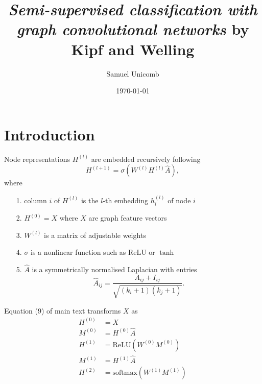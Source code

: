 \documentclass[mathserif,10pt]{beamer}
\title{\large \emph{Semi-supervised classification with graph convolutional networks} by Kipf and Welling}
\author{\scriptsize Samuel Unicomb}
\institute{\scriptsize MACSI, Department of Mathematics and Statistics, University of Limerick}
\date{\scriptsize \today}
\begin{document}
\def\fontspec{\fontsize{9pt}{11}\selectfont}

\begin{frame}
	\titlepage
\end{frame}

\section{Introduction}

\begin{frame}
  Node representations $H^{(l)}$ are embedded recursively following
  \begin{equation}
    H^{(l + 1)} = \sigma\left(W^{(l)} H^{(l)} \hat{A} \right),
  \end{equation}
  where
  \begin{itemize}
    \item[1.] column $i$ of $H^{(l)}$ is the $l$-th embedding $h^{(l)}_i$ of node $i$
    \item[2.] $H^{(0)} = X$ where $X$ are graph feature vectors
    \item[3.] $W^{(l)}$ is a matrix of adjustable weights
    \item[4.] $\sigma$ is a nonlinear function such as $\text{ReLU}$ or $\tanh$
    \item[5.] $\hat{A}$ is a symmetrically normalised Laplacian with entries
    \begin{equation*}
      \hat{A}_{ij} = \dfrac{A_{ij} + I_{ij}}{\sqrt{(k_i + 1)(k_j + 1)}}.
    \end{equation*}
  \end{itemize}
\end{frame}

\begin{frame}
  Equation (9) of main text transforms $X$ as
  \begin{subequations}
     \begin{align}
        H^{(0)} &= X \\
        M^{(0)} &= H^{(0)}\hat{A} \\
        H^{(1)} &= \text{ReLU}\left(W^{(0)} M^{(0)}\right) \\
        M^{(1)} &= H^{(1)}\hat{A} \\
        H^{(2)} &= \text{softmax}\left(W^{(1)} M^{(1)}\right)
     \end{align}
  \end{subequations}

\end{frame}
\end{document}
